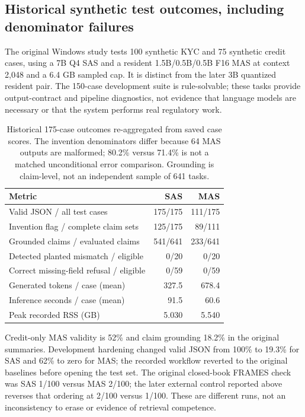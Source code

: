 \subsection{Historical synthetic test outcomes, including denominator failures}\label{sec:synthetic}
The original Windows study tests 100 synthetic KYC and 75 synthetic credit cases, using a 7B Q4 SAS and a resident 1.5B/0.5B/0.5B F16 MAS at context 2,048 and a 6.4 GB sampled cap. It is distinct from the later 3B quantized resident pair. The 150-case development suite is rule-solvable; these tasks provide output-contract and pipeline diagnostics, not evidence that language models are necessary or that the system performs real regulatory work.

\begin{table}[ht]\centering
\begin{tabular}{lrr}\toprule
Metric & SAS & MAS\\\midrule
Valid JSON / all test cases & 175/175 & 111/175\\
Invention flag / complete claim sets & 125/175 & 89/111\\
Grounded claims / evaluated claims & 541/641 & 233/641\\
Detected planted mismatch / eligible & 0/20 & 0/20\\
Correct missing-field refusal / eligible & 0/59 & 0/59\\
Generated tokens / case (mean) & 327.5 & 678.4\\
Inference seconds / case (mean) & 91.5 & 60.6\\
Peak recorded RSS (GB) & 5.030 & 5.540\\\bottomrule
\end{tabular}
\caption{Historical 175-case outcomes re-aggregated from saved case scores. The invention denominators differ because 64 MAS outputs are malformed; 80.2\% versus 71.4\% is not a matched unconditional error comparison. Grounding is claim-level, not an independent sample of 641 tasks.}\label{tab:synthetic}
\end{table}

Credit-only MAS validity is 52\% and claim grounding 18.2\% in the original summaries. Development hardening changed valid JSON from 100\% to 19.3\% for SAS and 62\% to zero for MAS; the recorded workflow reverted to the original baselines before opening the test set. The original closed-book FRAMES check was SAS 1/100 versus MAS 2/100; the later external control reported above reverses that ordering at 2/100 versus 1/100. These are different runs, not an inconsistency to erase or evidence of retrieval competence.

